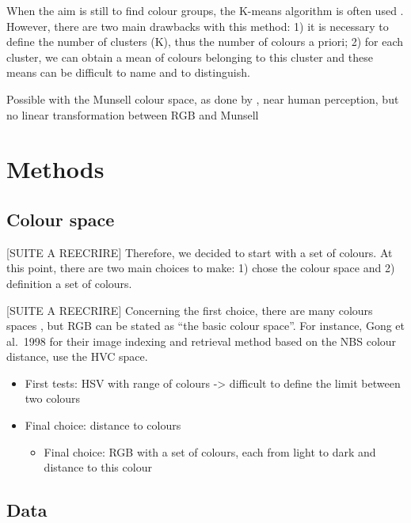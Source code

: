 \documentclass[11pt,a4paper]{article}
\begin{document}
When the aim is still to find colour groups, the
K-means algorithm is often used \cite[see e.g.][]{yendrikhovskij2001,konyushkova2015,hulee2007}. However, there are two main
drawbacks with this method: 1) it is necessary to define the number of
clusters (K), thus the number of colours a priori; 2) for each cluster,
we can obtain a mean of colours belonging to this cluster and these
means can be difficult to name and to distinguish.

Possible with the Munsell colour space, as done by \citet{kimbaelee2007}, near human perception, but no linear transformation between
RGB and Munsell \cite[see e.g.][]{zhangsokhansanjwuetal1998}

\section{Methods}\label{methods}

\subsection{Colour space}
\label{sec:colour-space}
{[}SUITE A REECRIRE{]} Therefore, we decided to start with a set of
colours. At this point, there are two main choices to make: 1) chose the
colour space and 2) definition a set of colours.

{[}SUITE A REECRIRE{]} Concerning the first choice, there are many
colours spaces \cite{tkalcictasic2003}, but RGB can be stated as ``the basic colour space''. For instance, Gong et al.~1998
for their image indexing and retrieval method based on the NBS colour
distance, use the HVC space.

\begin{itemize}
	
	\item
	First tests: HSV with range of colours -\textgreater{} difficult to
	define the limit between two colours
	\item
	Final choice: distance to colours
	
	\begin{itemize}
		\item
		Final choice: RGB with a set of colours, each from light to dark and
		distance to this colour
	\end{itemize}
\end{itemize}



\subsection{Data}
\end{document}
